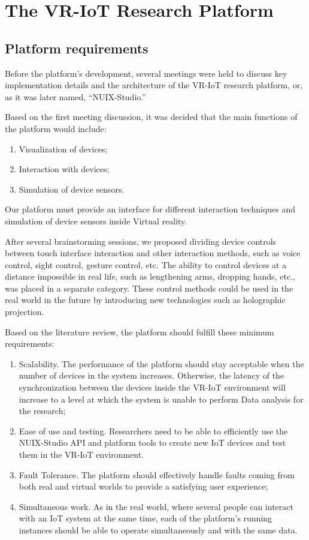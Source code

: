 
\chapter{The VR-IoT Research Platform}

\section{Platform requirements}

Before the platform's development, several meetings were held to discuss key implementation details and the architecture of the VR-IoT research platform, or, as it was later named, ``NUIX-Studio.''

Based on the first meeting discussion, it was decided that the main functions of the platform would include:
\begin{enumerate}
     \item Visualization of devices;
     \item Interaction with devices;
     \item Simulation of device sensors.
\end{enumerate}

Our platform must provide an interface for different interaction techniques and simulation of device sensors inside Virtual reality.

After several brainstorming sessions, we proposed dividing device controls between touch interface interaction and other interaction methods, such as voice control, sight control, gesture control, etc. The ability to control devices at a distance impossible in real life, such as lengthening arms, dropping hands, etc., was placed in a separate category. These control methods could be used in the real world in the future by introducing new technologies such as holographic projection.

Based on the literature review, the platform should fulfill these minimum requirements:
\begin{enumerate}
\item Scalability. The performance of the platform should stay acceptable when the number of devices in the system increases. Otherwise, the latency of the synchronization between the devices inside the VR-IoT environment will increase to a level at which the system is unable to perform Data analysis for the research;
\item Ease of use and testing. Researchers need to be able to efficiently use the NUIX-Studio API and platform tools to create new IoT devices and test them in the VR-IoT environment.
\item Fault Tolerance. The platform should effectively handle faults coming from both real and virtual worlds to provide a satisfying user experience;
\item Simultaneous work. As in the real world, where several people can interact with an IoT system at the same time, each of the platform's running instances should be able to operate simultaneously and with the same data.
\end{enumerate}

